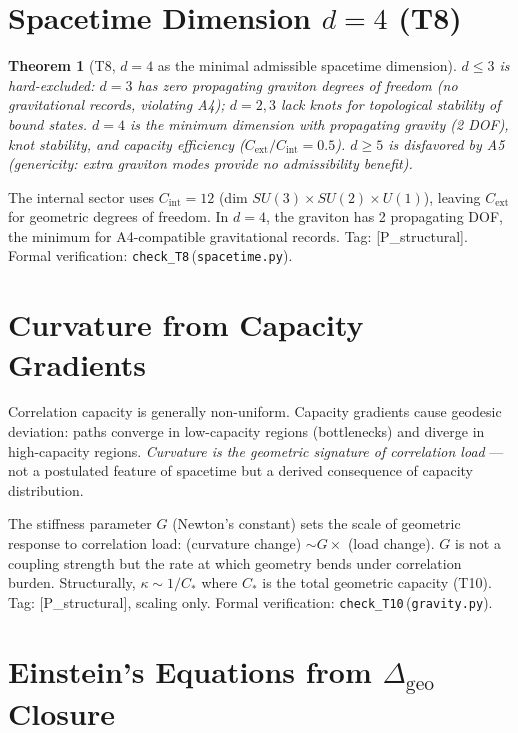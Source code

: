 \documentclass[11pt]{article}
\newtheorem{theorem}{Theorem}[section]
\newcommand{\coderef}[2]{\texttt{#1}\,(\texttt{#2})}
\begin{document}
\section{Spacetime Dimension $d = 4$ (T8)}

\begin{theorem}[T8, $d = 4$ as the minimal admissible spacetime dimension]
$d \le 3$ is hard-excluded: $d = 3$ has zero propagating graviton degrees of
freedom (no gravitational records, violating A4); $d = 2, 3$ lack knots for
topological stability of bound states. $d = 4$ is the minimum dimension with
propagating gravity (2 DOF), knot stability, and capacity efficiency
($C_{\mathrm{ext}}/C_{\mathrm{int}} = 0.5$). $d \ge 5$ is disfavored by A5
(genericity: extra graviton modes provide no admissibility benefit).
\end{theorem}

The internal sector uses $C_{\mathrm{int}} = 12$ (dim $SU(3)\!\times\!SU(2)\!\times\!U(1)$),
leaving $C_{\mathrm{ext}}$ for geometric degrees of freedom. In $d=4$, the
graviton has 2 propagating DOF, the minimum for A4-compatible gravitational
records. Tag: [P\_structural]. Formal verification: \coderef{check\_T8}{spacetime.py}.

\section{Curvature from Capacity Gradients}

Correlation capacity is generally non-uniform. Capacity gradients cause geodesic
deviation: paths converge in low-capacity regions (bottlenecks) and diverge in
high-capacity regions. \emph{Curvature is the geometric signature of correlation
load} --- not a postulated feature of spacetime but a derived consequence of
capacity distribution.

The stiffness parameter $G$ (Newton's constant) sets the scale of geometric
response to correlation load: (curvature change) $\sim G \times$ (load change).
$G$ is not a coupling strength but the rate at which geometry bends under
correlation burden. Structurally, $\kappa \sim 1/C_{\ast}$ where $C_{\ast}$ is
the total geometric capacity (T10). Tag: [P\_structural], scaling only.
Formal verification: \coderef{check\_T10}{gravity.py}.

\section{Einstein's Equations from $\Delta_{\mathrm{geo}}$ Closure}
\end{document}
